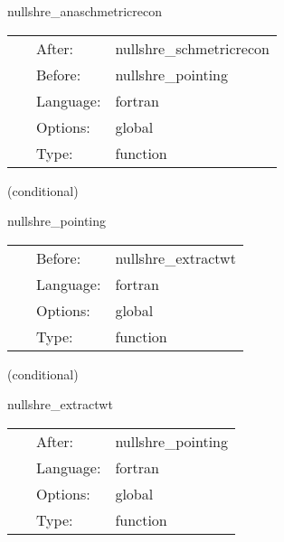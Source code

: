 \hspace{5mm} nullshre\_anaschmetricrecon 

\hspace{5mm}{\it current analytic schwarzchild metric and its derivatives on the sphere } 


\hspace{5mm}

 \begin{tabular*}{160mm}{cll} 
~ & After:  & nullshre\_schmetricrecon \\ 
~ & Before:  & nullshre\_pointing \\ 
~ & Language:  & fortran \\ 
~ & Options:  & global \\ 
~ & Type:  & function \\ 
\end{tabular*} 


\vspace{5mm}

   (conditional) 

\hspace{5mm} nullshre\_pointing 

\hspace{5mm}{\it gives the target variables for the pointers used in extraction } 


\hspace{5mm}

 \begin{tabular*}{160mm}{cll} 
~ & Before:  & nullshre\_extractwt \\ 
~ & Language:  & fortran \\ 
~ & Options:  & global \\ 
~ & Type:  & function \\ 
\end{tabular*} 


\vspace{5mm}

   (conditional) 

\hspace{5mm} nullshre\_extractwt 

\hspace{5mm}{\it computes the extracted variables on the world tube for the current level } 


\hspace{5mm}

 \begin{tabular*}{160mm}{cll} 
~ & After:  & nullshre\_pointing \\ 
~ & Language:  & fortran \\ 
~ & Options:  & global \\ 
~ & Type:  & function \\ 
\end{tabular*} 


